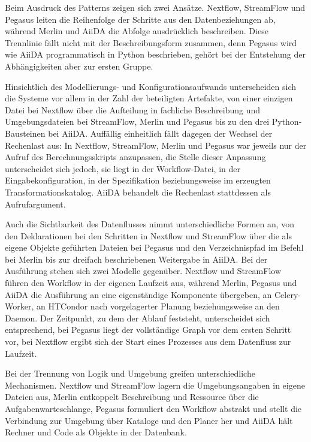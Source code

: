 Beim Ausdruck des Patterns zeigen sich zwei Ansätze. Nextflow,
StreamFlow und Pegasus leiten die Reihenfolge der Schritte aus den
Datenbeziehungen ab, während Merlin und AiiDA die Abfolge
ausdrücklich beschreiben. Diese Trennlinie fällt nicht mit der
Beschreibungsform zusammen, denn Pegasus wird wie AiiDA
programmatisch in Python beschrieben, gehört bei der Entstehung der
Abhängigkeiten aber zur ersten Gruppe.

Hinsichtlich des Modellierungs- und Konfigurationsaufwands
unterscheiden sich die Systeme vor allem in der Zahl der beteiligten
Artefakte, von einer einzigen Datei bei Nextflow über die Aufteilung
in fachliche Beschreibung und Umgebungsdateien bei StreamFlow, Merlin
und Pegasus bis zu den drei Python-Bausteinen bei AiiDA. Auffällig
einheitlich fällt dagegen der Wechsel der Rechenlast aus: In Nextflow, StreamFlow, Merlin und Pegasus war jeweils nur der Aufruf des Berechnungsskripts anzupassen, die Stelle dieser Anpassung unterscheidet sich jedoch, sie liegt in der Workflow-Datei, in der Eingabekonfiguration, in der Spezifikation beziehungsweise im erzeugten Transformationskatalog. AiiDA behandelt die Rechenlast stattdessen
als Aufrufargument.

Auch die Sichtbarkeit des Datenflusses nimmt unterschiedliche Formen
an, von den Deklarationen bei den Schritten in Nextflow und
StreamFlow über die als eigene Objekte geführten Dateien bei Pegasus
und den Verzeichnispfad im Befehl bei Merlin bis zur dreifach
beschriebenen Weitergabe in AiiDA. Bei der Ausführung stehen sich
zwei Modelle gegenüber. Nextflow und StreamFlow führen den Workflow
in der eigenen Laufzeit aus, während Merlin, Pegasus und AiiDA die
Ausführung an eine eigenständige Komponente übergeben, an
Celery-Worker, an HTCondor nach vorgelagerter Planung beziehungsweise
an den Daemon. Der Zeitpunkt, zu dem der Ablauf feststeht,
unterscheidet sich entsprechend, bei Pegasus liegt der vollständige
Graph vor dem ersten Schritt vor, bei Nextflow ergibt sich der Start
eines Prozesses aus dem Datenfluss zur Laufzeit.

Bei der Trennung von Logik und Umgebung greifen unterschiedliche
Mechanismen. Nextflow und StreamFlow lagern die Umgebungsangaben in
eigene Dateien aus, Merlin entkoppelt Beschreibung und Ressource über
die Aufgabenwarteschlange, Pegasus formuliert den Workflow abstrakt
und stellt die Verbindung zur Umgebung über Kataloge und den Planer
her und AiiDA hält Rechner und Code als Objekte in der Datenbank.

